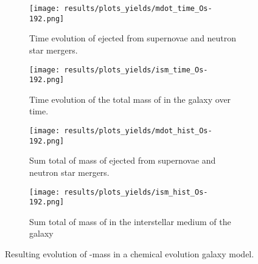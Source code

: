 \begin{figure}
  \begin{subfigure}{\subfigwidth}
    \centering
    \texttt{[image: results/plots\_yields/mdot\_time\_Os-192.png]}
    \caption{Time evolution of  ejected from supernovae and neutron star mergers.}
  \end{subfigure}
  \begin{subfigure}{\subfigwidth}
    \centering
    \texttt{[image: results/plots\_yields/ism\_time\_Os-192.png]}
    \caption{Time evolution of the total mass of  in the galaxy over time.}
  \end{subfigure}
  \begin{subfigure}{\subfigwidth}
    \centering
    \texttt{[image: results/plots\_yields/mdot\_hist\_Os-192.png]}
    \caption{Sum total of mass of  ejected from supernovae and neutron star mergers.}
  \end{subfigure}
  \begin{subfigure}{\subfigwidth}
    \centering
    \texttt{[image: results/plots\_yields/ism\_hist\_Os-192.png]}
    \caption{Sum total of mass of  in the interstellar medium of the galaxy}
  \end{subfigure}
  \caption{Resulting evolution of -mass in a chemical evolution galaxy model.}
\end{figure}
\begin{table}
  
\end{table}

